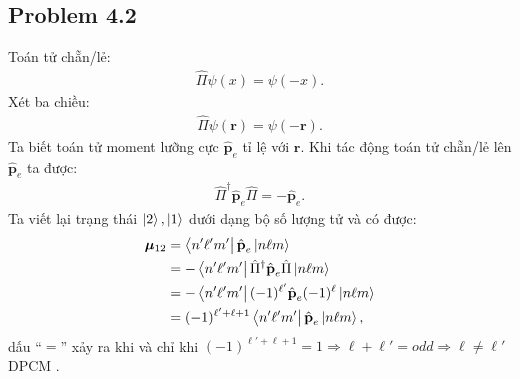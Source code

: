 \documentclass{article}
\renewcommand{\l}{\ell}
\begin{document}
\subsection*{Problem 4.2}
Toán tử chẵn/lẻ:
\begin{align*}
	\hat{\Pi} \psi(x) = \psi(-x).
\end{align*}
Xét ba chiều:
\begin{align*}
	\hat{\Pi} \psi(\mathbf{r}) = \psi(-\mathbf{r}).
\end{align*}
Ta biết toán tử moment lưỡng cực $\hat{\textbf{p}}_e$ tỉ lệ với $\mathbf{r}$. Khi tác động toán tử chẵn/lẻ lên $\hat{\textbf{p}}_e$ ta được:
\begin{align*}
	\hat{\Pi}^{\dagger} \hat{\textbf{p}}_e \hat{\Pi} = - \hat{\textbf{p}}_e.
\end{align*}
Ta viết lại trạng thái $\ket{2},\ket{1}$ dưới dạng bộ số lượng tử và có được:
\begin{align*}
	\boldsymbol{\mu}_{12}
	 & = \bra{n'\l'm'} \hat{\textbf{p}}_e \ket{n\l m}                                   \\
	 & =  - \bra{n'\l'm'}  \hat{\Pi}^{\dagger} \hat{\textbf{p}}_e \hat{\Pi} \ket{n\l m} \\
	 & =  - \bra{n'\l'm'}  (-1)^{\l'} \hat{\textbf{p}}_e (-1)^{\l} \ket{n\l m}          \\
	 & =  (-1)^{\l' + \l + 1} \bra{n'\l'm'}   \hat{\textbf{p}}_e \ket{n\l m},           
\end{align*}
dấu ``$=$'' xảy ra khi và chỉ khi $ (-1)^{\l' + \l + 1} = 1 \Rightarrow \l + \l' = odd \Rightarrow \l \neq \l'$ DPCM .
\end{document}
